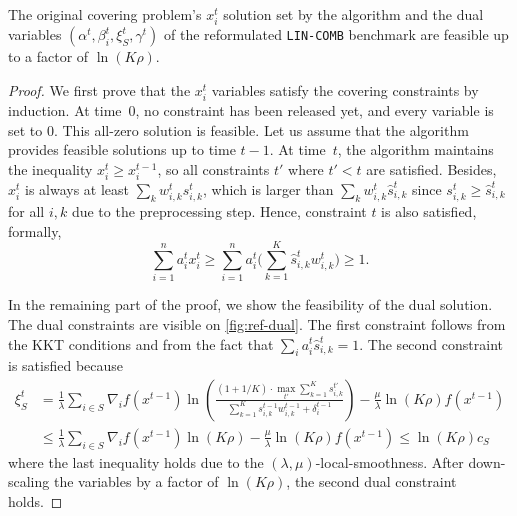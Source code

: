 \begin{lemma} \label{lem:convex-covering-feasibility}
The original covering problem's $x_{i}^{t}$ solution set by the algorithm and the dual variables $(\alpha^{t}, \beta_{i}^{t}, \xi_S^t, \gamma^t)$ of the reformulated \texttt{LIN-COMB} benchmark are feasible up to a factor of $\ln (K\rho)$.
\end{lemma}
%
\begin{proof}
We first prove that the $x_{i}^{t}$ variables satisfy the covering constraints by induction. At time~0, no constraint has been released yet, and every variable is set to 0. This all-zero solution is feasible. Let us assume that the algorithm provides feasible solutions up to time $t-1$. At time~$t$, the algorithm maintains the inequality $x_{i}^{t} \geq x_{i}^{t-1}$, so all constraints $t'$ where $t' < t$ are satisfied. Besides, $x_{i}^{t}$ is always at least
$\sum_{k} w_{i,k}^{t} s_{i,k}^{t}$, which is larger than $\sum_{k} w_{i,k}^{t} \hat{s}_{i,k}^{t}$ since $s_{i,k}^{t} \geq \hat{s}_{i,k}^{t}$
for all $i,k$ due to the preprocessing step. Hence, constraint $t$ is also satisfied, formally,
$$
\sum_{i=1}^{n} a_{i}^{t} x_{i}^{t}  \geq \sum_{i=1}^{n} a_{i}^{t} \biggl( \sum_{k=1}^{K} \hat{s}_{i,k}^{t} w_{i,k}^{t} \biggr) \geq 1.
$$

In the remaining part of the proof, we show the feasibility of the dual solution. The dual constraints are visible on \cref{fig:ref-dual}.
The first constraint follows from the KKT conditions and from the fact that $\sum_{i} a_i^{t} \hat{s}_{i,k}^{t} = 1$.
The second constraint is satisfied because
%
\begin{align*}
\xi_{S}^{t} &= \frac{1}{\lambda} \sum_{i \in S} \nabla_{i} f(x^{t-1}) \ln \left( \frac{(1 + 1/K) \cdot \max_{t'} \sum_{k=1}^{K} s_{i,k}^{t'}}{\sum_{k=1}^{K}  s_{i,k}^{t-1}w_{i,k}^{t-1}  + \delta_{i}^{t-1}} \right) - \frac{\mu}{\lambda} \ln(K\rho) f(x^{t-1})  \\
&\leq \frac{1}{\lambda} \sum_{i \in S} \nabla_{i} f(x^{t-1}) \ln(K\rho)  - \frac{\mu}{\lambda} \ln(K\rho) f(x^{t-1})
\leq  \ln(K\rho) c_S
\end{align*}
%
where the last inequality holds due to the $(\lambda,\mu)$-local-smoothness. After down-scaling the variables by a factor of $\ln (K\rho)$, the second dual constraint holds.


\end{proof}
